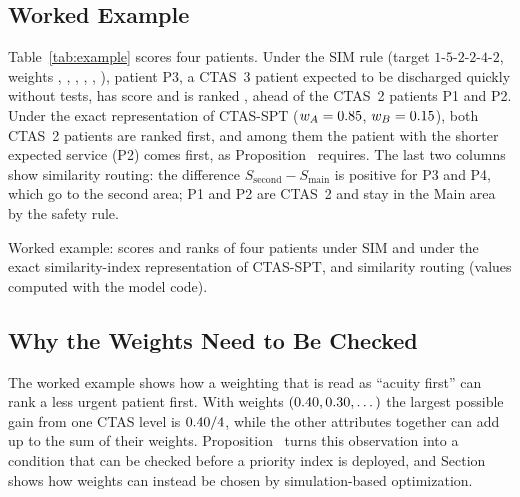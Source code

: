 \subsection{Worked Example}

Table~\ref{tab:example} scores four patients. Under the SIM rule (target $1$-$5$-$2$-$2$-$4$-$2$, weights \SimWA, \SimWB, \SimWC, \SimWD, \SimWE, \SimWF), patient P3, a CTAS~3 patient expected to be discharged quickly without tests, has score \WexPThreeSim{} and is ranked \WexPThreeRankSim{}, ahead of the CTAS~2 patients P1 and P2. Under the exact representation of CTAS-SPT ($w_A=0.85$, $w_B=0.15$), both CTAS~2 patients are ranked first, and among them the patient with the shorter expected service (P2) comes first, as Proposition~ requires. The last two columns show similarity routing: the difference $S_{\text{second}}-S_{\text{main}}$ is positive for P3 and P4, which go to the second area; P1 and P2 are CTAS~2 and stay in the Main area by the safety rule.

\begin{table}[!htbp]
\centering
\caption{Worked example: scores and ranks of four patients under SIM and under the exact similarity-index representation of CTAS-SPT, and similarity routing (values computed with the model code).}
\label{tab:example}
\footnotesize
\begin{adjustbox}{max width=\linewidth}\end{adjustbox}
\end{table}

\subsection{Why the Weights Need to Be Checked}

The worked example shows how a weighting that is read as ``acuity first'' can rank a less urgent patient first. With weights $(0.40,0.30,\dots)$ the largest possible gain from one CTAS level is $0.40/4$, while the other attributes together can add up to the sum of their weights. Proposition~ turns this observation into a condition that can be checked before a priority index is deployed, and Section~ shows how weights can instead be chosen by simulation-based optimization.
